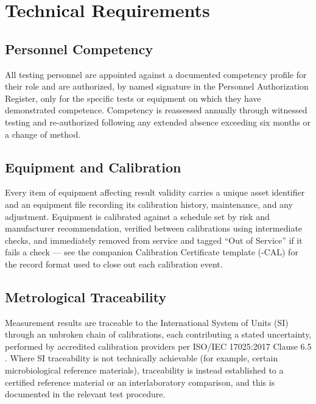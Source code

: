 
\section{Technical Requirements}

\subsection{Personnel Competency}

All testing personnel are appointed against a documented competency profile for their role
and are authorized, by named signature in the Personnel Authorization Register, only for the
specific tests or equipment on which they have demonstrated competence. Competency is
reassessed annually through witnessed testing and re-authorized following any extended
absence exceeding six months or a change of method.

\subsection{Equipment and Calibration}

Every item of equipment affecting result validity carries a unique asset identifier and an
equipment file recording its calibration history, maintenance, and any adjustment. Equipment
is calibrated against a schedule set by risk and manufacturer recommendation, verified
between calibrations using intermediate checks, and immediately removed from service and
tagged ``Out of Service'' if it fails a check --- see the companion Calibration Certificate
template (\doccode-CAL) for the record format used to close out each calibration event.

\subsection{Metrological Traceability}

Measurement results are traceable to the International System of Units (SI) through an
unbroken chain of calibrations, each contributing a stated uncertainty, performed by
accredited calibration providers per ISO/IEC 17025:2017 Clause 6.5 \cite{iso17025}. Where SI
traceability is not technically achievable (for example, certain microbiological reference
materials), traceability is instead established to a certified reference material or an
interlaboratory comparison, and this is documented in the relevant test procedure.

